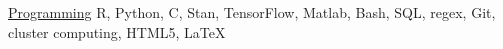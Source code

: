

\begin{cvskills}

  \cvskill
    {\href{https://github.com/sw1}{Programming}} %
    {R, Python, C, Stan, TensorFlow, Matlab, Bash, SQL, regex, Git, cluster computing, HTML5, \LaTeX} %

\end{cvskills}
